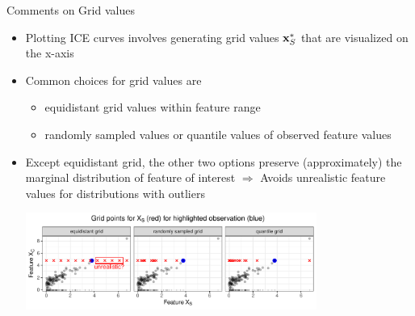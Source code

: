 \documentclass[11pt,compress,t,notes=noshow, aspectratio=169, xcolor=table]{beamer}
\begin{document}
\begin{frame}{Comments on Grid values}
\begin{itemize}
\item Plotting ICE curves involves generating grid values $\xv_S^*$ that are visualized on the x-axis
\item Common choices for grid values are
\begin{itemize}
\item equidistant grid values within feature range
\item randomly sampled values or quantile values of observed feature values
\end{itemize}
\item Except equidistant grid, the other two options preserve (approximately) the marginal distribution of feature of interest
$\Rightarrow$ Avoids unrealistic feature values for distributions with outliers %

\vspace{3pt}
\centering
\includegraphics[width=0.75\textwidth, trim=0cm 0cm 0cm 0cm, clip]{figure/sampling}

\end{itemize}
\end{frame}

\endlecture
\end{document}
